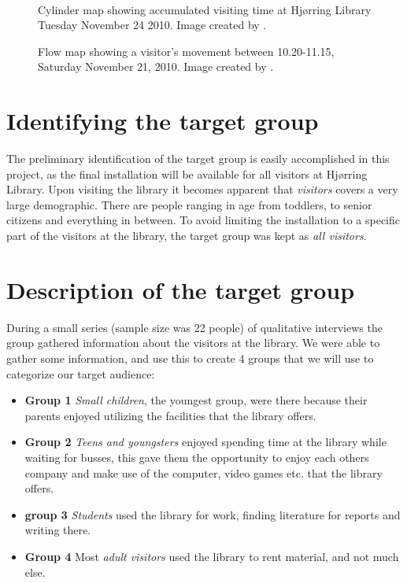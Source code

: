 \begin{figure}[htbp]
\begin{minipage}[b]{0.45\textwidth}
\end{minipage} \\ %
\begin{minipage}[t]{0.45\textwidth}
\caption{Cylinder map showing accumulated visiting time at Hj{\o}rring Library Tuesday November 24 2010. Image created by \citep{hjoerring_study}.} %
\label{fig:library_cylindermap}
\end{minipage} \hfill
\begin{minipage}[t]{0.45\textwidth}
\caption{Flow map showing a visitor's movement between 10.20-11.15, Saturday November 21, 2010. Image created by \citep{hjoerring_study}.} %
\label{fig:library_flowmap}
\end{minipage}
\end{figure}

\section{Identifying the target group}
The preliminary identification of the target group is easily accomplished in this project, as the final installation will be available for all visitors at Hj{\o}rring Library. Upon visiting the library it becomes apparent that \textit{visitors} covers a very large demographic. There are people ranging in age from toddlers, to senior citizens and everything in between. To avoid limiting the installation to a specific part of the visitors at the library, the target group was kept as \textit{all visitors}.

\section{Description of the target group}
During a small series (sample size was 22 people) of qualitative interviews the group gathered information about the visitors at the library. We were able to gather some information, and use this to create 4 groups that we will use to categorize our target audience:

\begin{itemize}

\item \textbf{Group 1} \textit{Small children}, the youngest group, were there because their parents enjoyed utilizing the facilities that the library offers.

\item \textbf{Group 2} \textit{Teens and youngsters} enjoyed spending time at the library while waiting for busses, this gave them the opportunity to enjoy each others company and make use of the computer, video games etc. that the library offers.

\item \textbf{group 3} \textit{Students} used the library for work, finding literature for reports and writing there.

\item \textbf{Group 4} Most \textit{adult visitors} used the library to rent material, and not much else.

\end{itemize}

